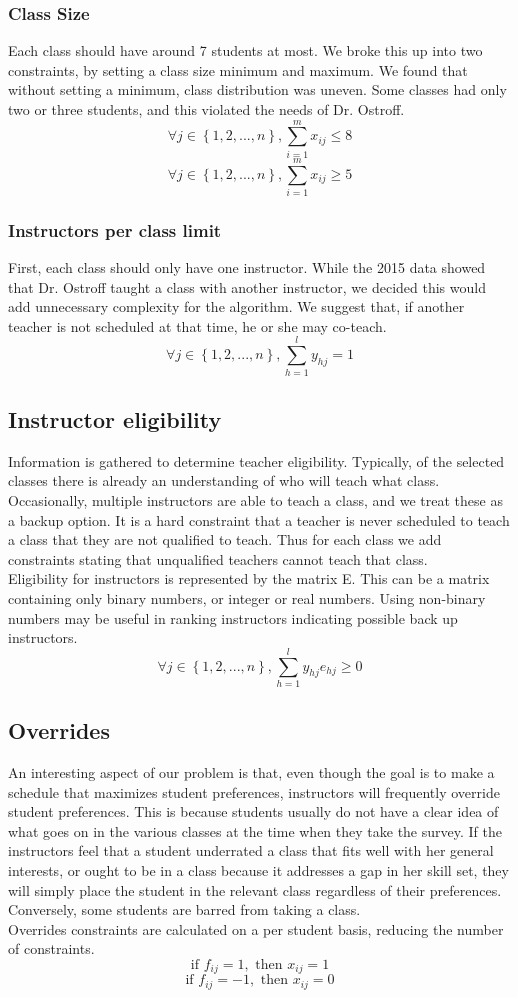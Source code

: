 \documentclass[11pt]{article}
\begin{document}
\subsubsection{Class Size}
Each class should have around 7 students at most. We broke this up into two constraints, by setting a class size minimum and maximum. We found that without setting a minimum, class distribution was uneven. Some classes had only two or three students, and this violated the needs of Dr. Ostroff.
\[\forall j \in \left\{ {1,2,...,n}\right\},\sum_{i=1}^{m}x_{ij} \leq 8\]
\[\forall j \in \left\{ {1,2,...,n}\right\},\sum_{i=1}^{m}x_{ij} \geq 5\]
\subsubsection{Instructors per class limit}
First, each class should only have one instructor. While the 2015 data showed that Dr. Ostroff taught a class with another instructor, we decided this would add unnecessary complexity for the algorithm. We suggest that, if another teacher is not scheduled at that time, he or she may co-teach.
\[\forall j \in \left\{ {1,2,...,n}\right\}, \sum_{h=1}^{l}y_{hj} = 1\]
\subsection{Instructor eligibility}
Information is gathered to determine teacher eligibility. Typically, of the selected classes there is already an understanding of who will teach what class. Occasionally, multiple instructors are able to teach a class, and we treat these as a backup option. It is a hard constraint that a teacher is never scheduled to teach a class that they are not qualified to teach. Thus for each class we add constraints stating that unqualified teachers cannot teach that class.\\
\indent Eligibility for instructors is represented by the matrix E. This can be a matrix containing only binary numbers, or integer or real numbers. Using non-binary numbers may be useful in ranking instructors indicating possible back up instructors.
\[\forall j \in \left\{ {1,2,...,n}\right\}, \sum_{h=1}^{l}y_{hj}e_{hj} \geq 0\]

	\subsection{Overrides}
An interesting aspect of our problem is that, even though the goal is to make a schedule that maximizes student preferences, instructors will frequently override student preferences. This is because students usually do not have a clear idea of what goes on in the various classes at the time when they take the survey. If the instructors feel that a student underrated a class that fits well with her general interests, or ought to be in a class because it addresses a gap in her skill set, they will simply place the student in the relevant class regardless of their preferences. Conversely, some students are barred from taking a class.\\
\indent Overrides constraints are calculated on a per student basis, reducing the number of constraints.
\[ \text{if } f_{ij} = 1, \text{ then } x_{ij} = 1\]
\[ \text{if } f_{ij} = -1, \text{ then } x_{ij} = 0\]
\end{document}
